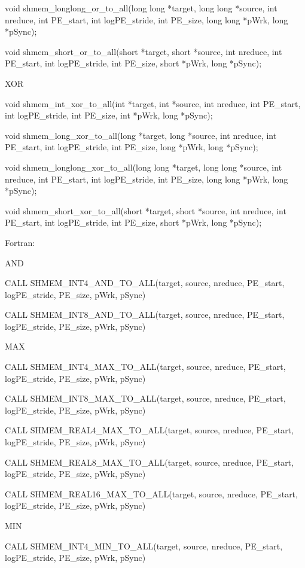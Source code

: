 	  void	shmem_longlong_or_to_all(long long *target, long long *source,
	  int nreduce, int PE_start, int logPE_stride, int PE_size, long  long
	  *pWrk, long *pSync);

	  void	 shmem_short_or_to_all(short   *target,	  short	 *source,  int
	  nreduce, int PE_start, int logPE_stride, int PE_size,	 short	*pWrk,
	  long *pSync);
	  
	  XOR
	  
	  void shmem_int_xor_to_all(int *target, int *source, int nreduce, int
	  PE_start, int logPE_stride, int PE_size, int *pWrk, long *pSync);

	  void	shmem_long_xor_to_all(long *target, long *source, int nreduce,
	  int PE_start,	 int  logPE_stride,  int  PE_size,  long  *pWrk,  long
	  *pSync);

	  void shmem_longlong_xor_to_all(long long *target, long long *source,
	  int nreduce, int PE_start, int logPE_stride, int PE_size, long  long
	  *pWrk, long *pSync);

	  void	 shmem_short_xor_to_all(short	*target,  short	 *source,  int
	  nreduce, int PE_start, int logPE_stride, int PE_size,	 short	*pWrk,
	  long *pSync);

       Fortran:
           
           AND

	  CALL	 SHMEM_INT4_AND_TO_ALL(target,	 source,   nreduce,  PE_start,
	  logPE_stride, PE_size, pWrk, pSync)

	  CALL	SHMEM_INT8_AND_TO_ALL(target,	source,	  nreduce,   PE_start,
	  logPE_stride, PE_size, pWrk, pSync)
	  
	  MAX
	  
	  CALL	 SHMEM_INT4_MAX_TO_ALL(target,	 source,   nreduce,  PE_start,
	  logPE_stride, PE_size, pWrk, pSync)

	  CALL	SHMEM_INT8_MAX_TO_ALL(target,	source,	  nreduce,   PE_start,
	  logPE_stride, PE_size, pWrk, pSync)

	  CALL	 SHMEM_REAL4_MAX_TO_ALL(target,	  source,  nreduce,  PE_start,
	  logPE_stride, PE_size, pWrk, pSync)

	  CALL	SHMEM_REAL8_MAX_TO_ALL(target,	source,	  nreduce,   PE_start,
	  logPE_stride, PE_size, pWrk, pSync)

	  CALL	 SHMEM_REAL16_MAX_TO_ALL(target,  source,  nreduce,  PE_start,
	  logPE_stride, PE_size, pWrk, pSync)
	  
	  MIN
	  
	  CALL	 SHMEM_INT4_MIN_TO_ALL(target,	 source,   nreduce,  PE_start,
	  logPE_stride, PE_size, pWrk, pSync)

